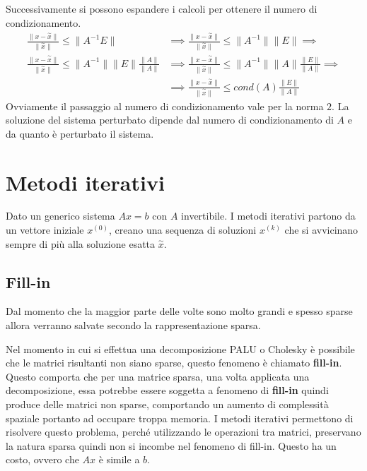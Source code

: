 Successivamente si possono espandere i calcoli per ottenere il numero di condizionamento.
\begin{equation*}
    \begin{aligned}
        \frac{\|x - \stackrel{\sim}{x}\|}{\|\stackrel{\sim}{x}\|} \leq \|A^{-1}E\|
         & \implies \frac{\|x - \stackrel{\sim}{x}\|}{\|\stackrel{\sim}{x}\|} \leq \|A^{-1}\|\|E\| \implies \\
        \frac{\|x - \stackrel{\sim}{x}\|}{\|\stackrel{\sim}{x}\|} \leq \|A^{-1}\|\|E\|\frac{\|A\|}{\|A\|} 
        & \implies \frac{\|x - \stackrel{\sim}{x}\|}{\|\stackrel{\sim}{x}\|} \leq \|A^{-1}\|\|A\|\frac{\|E\|}{\|A\|} \implies \\
        & \implies \frac{\|x - \stackrel{\sim}{x}\|}{\|\stackrel{\sim}{x}\|} \leq cond(A)\frac{\|E\|}{\|A\|}
    \end{aligned}
\end{equation*}
Ovviamente il passaggio al numero di condizionamento vale per la norma $2$. La
soluzione del sistema perturbato dipende dal numero di condizionamento di $A$ e
da quanto è perturbato il sistema.
\section{Metodi iterativi}
Dato un generico sistema $Ax=b$ con $A$ invertibile.
I metodi iterativi partono da un vettore iniziale $x^{(0)}$, creano una sequenza
di soluzioni $x^{(k)}$ che si avvicinano sempre di più alla soluzione esatta
$\stackrel{\sim}{x}$.

\subsection{Fill-in}
Dal momento che la maggior parte delle volte sono molto grandi e spesso sparse
allora verranno salvate secondo la rappresentazione sparsa.

Nel momento in cui si effettua una decomposizione PALU o Cholesky è possibile che
le matrici risultanti non siano sparse, questo fenomeno è chiamato \textbf{fill-in}.
Questo comporta che per una matrice sparsa, una volta applicata una decomposizione,
essa potrebbe essere soggetta a fenomeno di \textbf{fill-in} quindi produce
delle matrici non sparse, comportando un aumento di complessità spaziale portanto
ad occupare troppa memoria. I metodi iterativi permettono di risolvere questo problema,
perché utilizzando le operazioni tra matrici, preservano la natura sparsa quindi
non si incombe nel fenomeno di fill-in. Questo ha un costo, ovvero che $Ax$ è simile 
a $b$.

